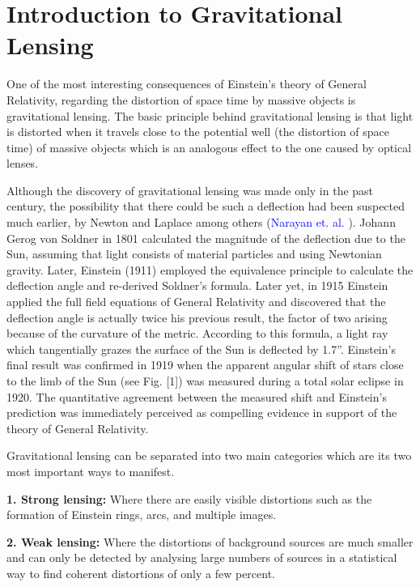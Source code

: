 \chapter{Introduction to Gravitational Lensing}

One of the most interesting consequences of Einstein's theory of General Relativity, regarding the distortion of space time by massive objects is gravitational lensing. The basic principle behind gravitational lensing is that light is distorted when it travels close to the potential well (the distortion of space time) of massive objects which is an analogous effect to the one caused by optical lenses. 

Although the discovery of gravitational lensing was made only in the past century, the possibility that there could be such a deflection had been suspected much earlier, by Newton and Laplace among others (\textcolor{blue}{Narayan et. al.} \citeyear{Reference25}). Johann Gerog von Soldner in 1801 calculated the magnitude of the deflection due to the Sun, assuming that light consists of material particles and using Newtonian gravity. Later, Einstein (1911) employed the equivalence principle to calculate the deflection angle and re-derived Soldner’s formula. Later yet, in 1915 Einstein applied the full field equations of General Relativity and discovered that the deflection angle is actually twice his previous result, the factor of two arising because of the curvature of the metric. According to this formula, a light ray which tangentially grazes the surface of the Sun is deflected by 1.7''. Einstein’s final result was confirmed in 1919 when the apparent angular shift of stars close to the limb of the Sun (see Fig. [1]) was measured during a total solar eclipse in 1920. The quantitative agreement between the measured shift and Einstein’s prediction was immediately perceived as compelling evidence in support of the theory of General Relativity.

Gravitational lensing can be separated into two main categories which are its two most important ways to manifest.

\textbf{1. Strong lensing:} Where there are easily visible distortions such as the formation of Einstein rings, arcs, and multiple images.

\textbf{2. Weak lensing:} Where the distortions of background sources are much smaller and can only be detected by analysing large numbers of sources in a statistical way to find coherent distortions of only a few percent.

